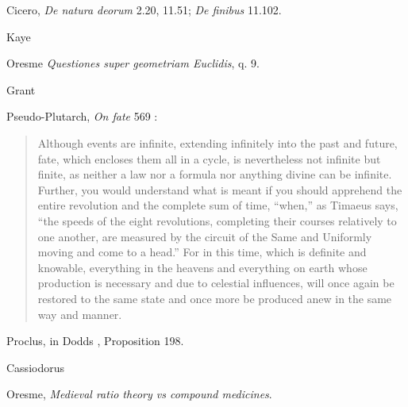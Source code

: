 \documentclass{article}
\begin{document}
Cicero, {\em De natura deorum} 2.20, 11.51; {\em De finibus} 11.102.

Kaye \cite[pp.~430--442]{kaye}

Oresme {\em Questiones super geometriam Euclidis}, q. 9.

Grant \cite[pp.~288--313]{grant1971}

Pseudo-Plutarch, {\em On fate} 569 \cite[p.~317]{moraliaVII}:

\begin{quote}
Although events are infinite, extending infinitely into the past and future, fate, which encloses them all in a cycle, is nevertheless not infinite but finite, as neither a law nor a formula
nor anything divine can be infinite. Further, you would understand what is meant if you should apprehend the entire revolution and the complete sum of time, ``when,''
as Timaeus says, ``the speeds of the eight revolutions, completing their courses relatively to one another, are measured by the circuit of the Same and Uniformly moving and come to a head.''
For
in this time, which is definite and knowable, everything in the heavens
and everything on earth whose production is necessary and due to 
celestial influences, will once again be restored to the same state
and once more be produced anew in the same way and manner.
\end{quote}


Proclus, in Dodds \cite[pp.~173, 302]{dodds}, Proposition 198.

Cassiodorus \cite{cassiodorus}

Oresme, {\em Medieval ratio theory vs compound medicines}.

\nocite{*}



\end{document}

